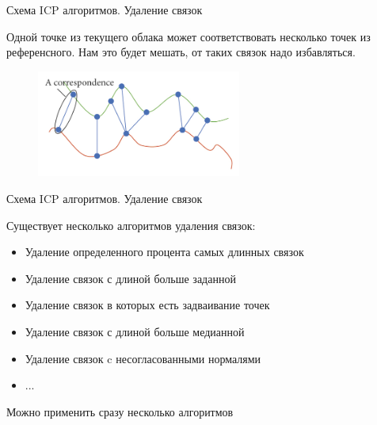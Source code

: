 \documentclass[6pt,pdf,utf8,russian]{beamer}
\begin{document}
\begin{frame}[fragile]{Схема ICP алгоритмов. Удаление связок}
    \begin{block}{}
        Одной точке из текущего облака может соответствовать несколько точек из референсного.
        Нам это будет мешать, от таких связок надо избавляться.
    \end{block}

    \begin{figure}
        \includegraphics[width=0.6\textwidth]{images/correspondence_erasure_1.jpg}
    \end{figure}

\end{frame}

\begin{frame}[fragile]{Схема ICP алгоритмов. Удаление связок}
    \begin{block}{}
        Существует несколько алгоритмов удаления связок:
        \begin{itemize}
            \item Удаление определенного процента самых длинных связок
            \item Удаление связок с длиной больше заданной
            \item Удаление связок в которых есть задваивание точек
            \item Удаление связок с длиной больше медианной
            \item Удаление связок c несогласованными нормалями
            \item ...
        \end{itemize}
    \end{block}

    \pause

    \begin{block}{}
        Можно применить сразу несколько алгоритмов
    \end{block}

\end{frame}
\end{document}
